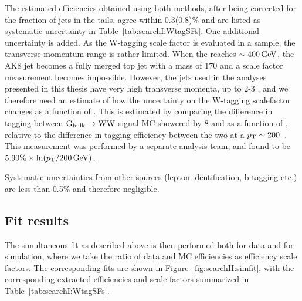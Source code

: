 The estimated efficiencies obtained using both methods, after being corrected for the fraction of \PW jets in the tails, agree within 0.3(0.8)\% and are listed as systematic uncertainty in Table~\ref{tab:searchI:WtagSFs}.\newline
One additional uncertainty is added. As the W-tagging scale factor is evaluated in a \ttbar sample, the transverse momentum range is rather limited. When the \PW \PT reaches $\sim 400 \,\text{Ge\hspace{-.08em}V}$, the AK8 jet becomes a fully merged top jet with a mass of 170 \GeV and a scale factor measurement becomes impossible. However, the jets used in the analyses presented in this thesis have very high transverse momenta, up to 2-3 \TeV, and we therefore need an estimate of how the uncertainty on the W-tagging scalefactor changes as a function of \PT. This is estimated by comparing the difference in tagging between $\mathrm{G}_\mathrm{bulk} \rightarrow \mathrm{W} \mathrm{W}$ signal MC showered by \PYTHIA{}8 and \HERWIG{++} as a function of \PT, relative to the difference in tagging efficiency between the two at a $p_{\mathrm{T}} \sim 200$~\GeV. This measurement was performed by a separate analysis team, and found to be $5.90\% \times \ln(p_{\mathrm{T}}/200\,\text{Ge\hspace{-.08em}V})$.


Systematic uncertainties from other sources (lepton identification, b tagging etc.) are less than 0.5\% and therefore negligible.

\subsection{Fit results}
The simultaneous fit as described above is then performed both for data and for simulation, where we take the ratio of data and MC efficiencies as efficiency scale factors.
The corresponding fits are shown in Figure~\ref{fig:searchII:simfit}, with the corresponding extracted efficiencies and scale factors summarized in Table~\ref{tab:searchI:WtagSFs}.

